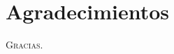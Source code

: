 \chapter*{Agradecimientos}
   
   \lettrine[lines=9] {\initfamily  \selectfont G}{racias.} \blindtext

\blindtext

\blindtext

\blindtext